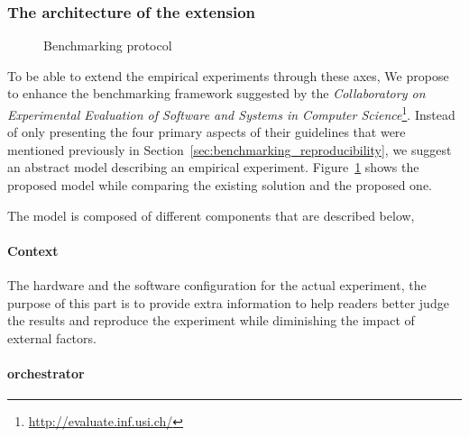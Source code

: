 \subsubsection{The architecture of the extension}
\begin{figure}
    \caption{Benchmarking protocol}\label{fig:benchmarkingprotocol}
\end{figure}
To be able to extend the empirical experiments through these axes,
We propose to enhance the benchmarking framework suggested by the \emph{Collaboratory on Experimental Evaluation of Software and Systems in Computer Science}\footnote{\url{http://evaluate.inf.usi.ch/}}.
Instead of only presenting the four primary aspects of their guidelines that were mentioned previously in Section~\ref{sec:benchmarking_reproducibility}, we suggest an abstract model describing an empirical experiment.
Figure~\ref{fig:benchmarkingprotocol} shows the proposed model while comparing the existing solution and the proposed one.

The model is composed of different components that are described below,
\paragraph{Context}
The hardware and the software configuration for the actual experiment, the purpose of this part is to provide extra information to help readers better judge the results and reproduce the experiment while diminishing the impact of external factors.

\paragraph{orchestrator}

